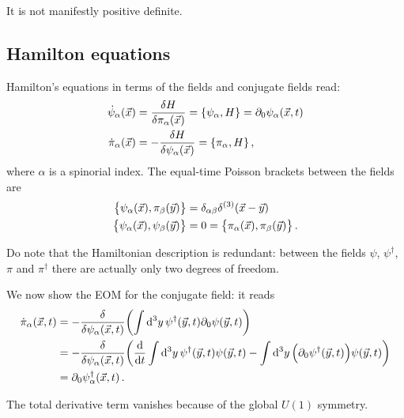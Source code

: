 \documentclass[main.tex]{subfiles}
\begin{document}
It is not manifestly positive definite. 

\subsection{Hamilton equations}

Hamilton's equations in terms of the fields and conjugate fields read: 
%
\begin{subequations}
\begin{align}
\dot{\psi}_{\alpha } (\vec{x}) &= \fdv{H}{\pi_{\alpha }(\vec{x})} = \qty{\psi_{\alpha }, H} = \partial_0 \psi_{\alpha } (\vec{x}, t)\\
\dot{\pi }_{\alpha } (\vec{x}) &= - \fdv{H}{\psi _{\alpha }(\vec{x})} = \qty{\pi_{\alpha }, H} 
\,,
\end{align}
\end{subequations}
%
where \(\alpha \) is a spinorial index. 
The equal-time Poisson brackets between the fields are 
%
\begin{subequations}
\begin{align}
\qty{\psi_{\alpha } (\vec{x}), \pi_{\beta } (\vec{y})} &= \delta_{\alpha \beta } \delta^{(3)} (\vec{x}-\vec{y})  \\
\qty{\psi_{\alpha }(\vec{x}), \psi_{\beta }(\vec{y})} 
&= 0 = 
\qty{\pi_{\alpha }(\vec{x}), \pi_{\beta }(\vec{y})} 
\,.
\end{align}
\end{subequations}

Do note that the Hamiltonian description is redundant: between the fields \(\psi \), \(\psi ^\dag\), \(\pi \) and \(\pi ^\dag\) there are actually only two degrees of freedom. 

We now show the EOM for the conjugate field: it reads 
%
\begin{subequations}
\begin{align}
\dot{\pi}_{\alpha } (\vec{x}, t)
&= - \fdv{}{\psi_{\alpha }(\vec{x}, t)}
\qty(\int \dd[3]{y} \psi ^\dag(\vec{y}, t) \partial_0 \psi (\vec{y}, t))  \\
&= - \fdv{}{\psi_{\alpha }(\vec{x}, t)}
\qty(\dv{}{t} \int \dd[3]{y} \psi ^\dag(\vec{y}, t) \psi (\vec{y}, t)
- \int \dd[3]{y} \qty(\partial_0 \psi ^\dag (\vec{y},t) ) \psi (\vec{y}, t)
)  \\
&= \partial_0 \psi ^\dag_{\alpha } (\vec{x}, t)
\,.
\end{align}
\end{subequations}

The total derivative term vanishes because of the global \(U(1)\) symmetry. 
\end{document}

